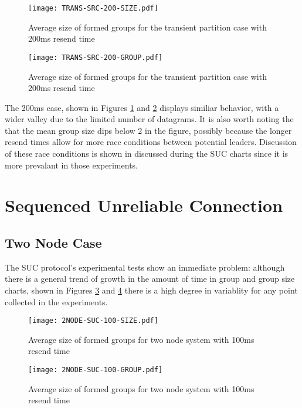 \begin{figure}[!h]
\centering
\texttt{[image: TRANS-SRC-200-SIZE.pdf]}
\caption{Average size of formed groups for the transient partition case with 200ms resend time}
\label{fig:MGS-SRC-TRANS-200}
\end{figure}

\begin{figure}[!h]
\centering
\texttt{[image: TRANS-SRC-200-GROUP.pdf]}
\caption{Average size of formed groups for the transient partition case with 200ms resend time}
\label{fig:IGT-SRC-TRANS-200}
\end{figure}

The 200ms case, shown in Figures \ref{fig:MGS-SRC-TRANS-200} and \ref{fig:IGT-SRC-TRANS-200} displays similiar behavior, with a wider valley due to the
limited number of datagrams. It is also worth noting the that the mean group
size dips below 2 in the figure, possibly because the longer resend times allow
for more race conditions between potential leaders. Discussion of these race
conditions is shown in discussed during the SUC charts since it is more prevalant
in those experiments.

\section{Sequenced Unreliable Connection}

\subsection{Two Node Case}

The SUC protocol's experimental tests show an immediate problem: although there
is a general trend of growth in the amount of time in group and group size
charts, shown in Figures \ref{fig:MGS-SUC-2NODE-100} and \ref{fig:IGT-SUC-2NODE-100}
there is a high degree in variablity for any point collected in the experiments.

\begin{figure}[!h]
\centering
\texttt{[image: 2NODE-SUC-100-SIZE.pdf]}
\caption{Average size of formed groups for two node system with 100ms resend time}
\label{fig:MGS-SUC-2NODE-100}
\end{figure}

\begin{figure}[!h]
\centering
\texttt{[image: 2NODE-SUC-100-GROUP.pdf]}
\caption{Average size of formed groups for two node system with 100ms resend time}
\label{fig:IGT-SUC-2NODE-100}
\end{figure}

